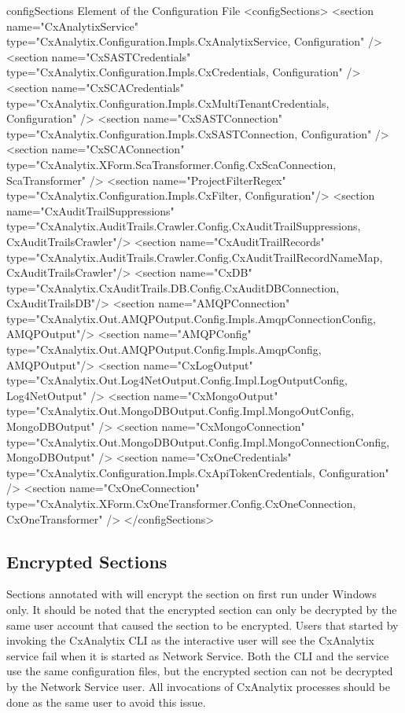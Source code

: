 \begin{code}{configSections Element of the Configuration File}{\label{lst:motouch}}{}
<configSections>
    <section name="CxAnalytixService" 
        type="CxAnalytix.Configuration.Impls.CxAnalytixService, Configuration" />
    <section name="CxSASTCredentials" 
        type="CxAnalytix.Configuration.Impls.CxCredentials, Configuration" />
    <section name="CxSCACredentials" 
        type="CxAnalytix.Configuration.Impls.CxMultiTenantCredentials, Configuration" />
    <section name="CxSASTConnection" 
        type="CxAnalytix.Configuration.Impls.CxSASTConnection, Configuration" />
    <section name="CxSCAConnection" 
        type="CxAnalytix.XForm.ScaTransformer.Config.CxScaConnection, ScaTransformer" />
    <section name="ProjectFilterRegex" 
        type="CxAnalytix.Configuration.Impls.CxFilter, Configuration"/>
    <section name="CxAuditTrailSuppressions" 
        type="CxAnalytix.AuditTrails.Crawler.Config.CxAuditTrailSuppressions, CxAuditTrailsCrawler"/>
    <section name="CxAuditTrailRecords" 
        type="CxAnalytix.AuditTrails.Crawler.Config.CxAuditTrailRecordNameMap, CxAuditTrailsCrawler"/>
    <section name="CxDB" 
        type="CxAnalytix.CxAuditTrails.DB.Config.CxAuditDBConnection, CxAuditTrailsDB"/>
    <section name="AMQPConnection" 
        type="CxAnalytix.Out.AMQPOutput.Config.Impls.AmqpConnectionConfig, AMQPOutput"/>
    <section name="AMQPConfig" 
        type="CxAnalytix.Out.AMQPOutput.Config.Impls.AmqpConfig, AMQPOutput"/>
    <section name="CxLogOutput" 
        type="CxAnalytix.Out.Log4NetOutput.Config.Impl.LogOutputConfig, Log4NetOutput" />
    <section name="CxMongoOutput" 
        type="CxAnalytix.Out.MongoDBOutput.Config.Impl.MongoOutConfig, MongoDBOutput" />
    <section name="CxMongoConnection" 
        type="CxAnalytix.Out.MongoDBOutput.Config.Impl.MongoConnectionConfig, MongoDBOutput" />
    <section name="CxOneCredentials" 
        type="CxAnalytix.Configuration.Impls.CxApiTokenCredentials, Configuration" />
    <section name="CxOneConnection" 
        type="CxAnalytix.XForm.CxOneTransformer.Config.CxOneConnection, CxOneTransformer" />
</configSections>
\end{code}

\subsection{Encrypted Sections}

Sections annotated with \encrypts will encrypt the section on first run under Windows only.  It should be noted that the encrypted section
can only be decrypted by the same user account that caused the section to be encrypted.  Users that started by invoking the CxAnalytix CLI 
as the interactive user will see the CxAnalytix service fail when it is started as Network Service.  Both the CLI and the service use the
same configuration files, but the encrypted section can not be decrypted by the Network Service user.  All invocations of CxAnalytix
processes should be done as the same user to avoid this issue.


